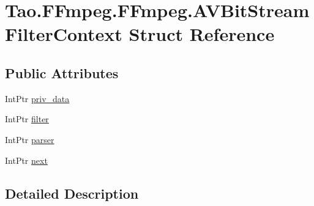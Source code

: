 \hypertarget{struct_tao_1_1_f_fmpeg_1_1_f_fmpeg_1_1_a_v_bit_stream_filter_context}{
\section{Tao.FFmpeg.FFmpeg.AVBitStreamFilterContext Struct Reference}
\label{struct_tao_1_1_f_fmpeg_1_1_f_fmpeg_1_1_a_v_bit_stream_filter_context}
}
\subsection*{Public Attributes}
\begin{DoxyCompactItemize}
\item 
IntPtr \hyperlink{struct_tao_1_1_f_fmpeg_1_1_f_fmpeg_1_1_a_v_bit_stream_filter_context_aba2f9f27cc74572e96db9b7db574140d}{priv\_\-data}
\item 
IntPtr \hyperlink{struct_tao_1_1_f_fmpeg_1_1_f_fmpeg_1_1_a_v_bit_stream_filter_context_aa8e64cdb98d5e5aa1b2c1f8182a14222}{filter}
\item 
IntPtr \hyperlink{struct_tao_1_1_f_fmpeg_1_1_f_fmpeg_1_1_a_v_bit_stream_filter_context_abe7eeae8e8f2c0521e9d8809287ce674}{parser}
\item 
IntPtr \hyperlink{struct_tao_1_1_f_fmpeg_1_1_f_fmpeg_1_1_a_v_bit_stream_filter_context_aab4764ec673799ebd6eac3c652a344dc}{next}
\end{DoxyCompactItemize}


\subsection{Detailed Description}


